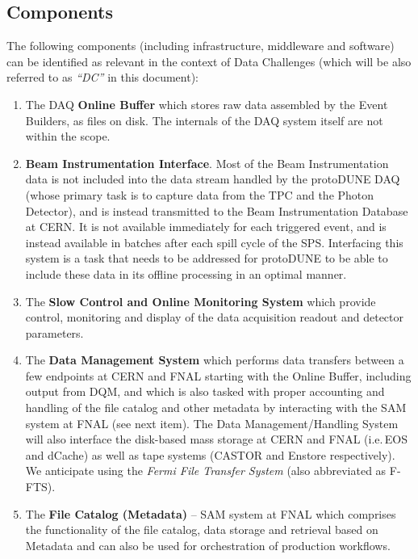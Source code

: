 \documentclass[pdftex,12pt,letter]{article}
\newcommand{\pd}{protoDUNE\xspace}
\begin{document}
\subsection{Components}
The following components (including infrastructure, middleware and software) can be identified as relevant in the context
of Data Challenges (which will be also referred to as \textit{``DC''} in this document):
\begin{enumerate}
\item The DAQ \textbf{Online Buffer} which stores raw data assembled by the Event Builders, as files on disk. The internals
of the DAQ system itself are not within the scope.

\item  \textbf{Beam Instrumentation Interface}. Most of the Beam Instrumentation data is not included into the data stream
handled by the \pd DAQ (whose primary task is to capture data from the TPC and the Photon Detector), and is instead
transmitted to the Beam Instrumentation Database at CERN. It is not available immediately for each triggered event,
and is instead available in batches after each spill cycle of the SPS. Interfacing this system is a task that needs
to be addressed for \pd to be able to include these data in its offline processing in an optimal manner.

\item The \textbf{Slow Control and Online Monitoring System} which provide control, monitoring and display of the data acquisition readout and detector parameters. 

\item The \textbf{Data Management System}\cite{docdb1212}  which performs data transfers between a few endpoints
at CERN and FNAL starting with the Online Buffer, including output from DQM,  and which is also tasked with proper accounting and handling of the file catalog and other metadata
by interacting with the SAM system at FNAL (see next item). The Data Management/Handling System will also interface the disk-based mass storage
at CERN and FNAL (i.e.\,EOS\cite{eos} and dCache) as well as tape systems (CASTOR and Enstore respectively).
We anticipate using the \textit{Fermi File Transfer System} (also abbreviated as F-FTS\cite{fts}).

\item The \textbf{File Catalog (Metadata)}  -- SAM system at FNAL which comprises the functionality of the file catalog, data storage and
retrieval based on Metadata and can also be used for orchestration of production workflows.


\end{enumerate}
\end{document}
